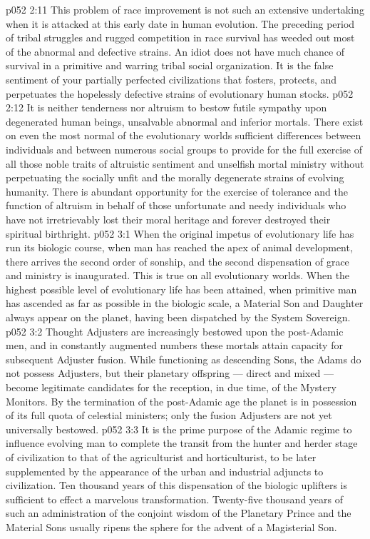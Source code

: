 \vs p052 2:11 This problem of race improvement is not such an extensive undertaking when it is attacked at this early date in human evolution. The preceding period of tribal struggles and rugged competition in race survival has weeded out most of the abnormal and defective strains. An idiot does not have much chance of survival in a primitive and warring tribal social organization. It is the false sentiment of your partially perfected civilizations that fosters, protects, and perpetuates the hopelessly defective strains of evolutionary human stocks.
\vs p052 2:12 It is neither tenderness nor altruism to bestow futile sympathy upon degenerated human beings, unsalvable abnormal and inferior mortals. There exist on even the most normal of the evolutionary worlds sufficient differences between individuals and between numerous social groups to provide for the full exercise of all those noble traits of altruistic sentiment and unselfish mortal ministry without perpetuating the socially unfit and the morally degenerate strains of evolving humanity. There is abundant opportunity for the exercise of tolerance and the function of altruism in behalf of those unfortunate and needy individuals who have not irretrievably lost their moral heritage and forever destroyed their spiritual birthright.
\vs p052 3:1 When the original impetus of evolutionary life has run its biologic course, when man has reached the apex of animal development, there arrives the second order of sonship, and the second dispensation of grace and ministry is inaugurated. This is true on all evolutionary worlds. When the highest possible level of evolutionary life has been attained, when primitive man has ascended as far as possible in the biologic scale, a Material Son and Daughter always appear on the planet, having been dispatched by the System Sovereign.
\vs p052 3:2 Thought Adjusters are increasingly bestowed upon the post\hyp{}Adamic men, and in constantly augmented numbers these mortals attain capacity for subsequent Adjuster fusion. While functioning as descending Sons, the Adams do not possess Adjusters, but their planetary offspring --- direct and mixed --- become legitimate candidates for the reception, in due time, of the Mystery Monitors. By the termination of the post\hyp{}Adamic age the planet is in possession of its full quota of celestial ministers; only the fusion Adjusters are not yet universally bestowed.
\vs p052 3:3 \pc It is the prime purpose of the Adamic regime to influence evolving man to complete the transit from the hunter and herder stage of civilization to that of the agriculturist and horticulturist, to be later supplemented by the appearance of the urban and industrial adjuncts to civilization. Ten thousand years of this dispensation of the biologic uplifters is sufficient to effect a marvelous transformation. Twenty\hyp{}five thousand years of such an administration of the conjoint wisdom of the Planetary Prince and the Material Sons usually ripens the sphere for the advent of a Magisterial Son.
